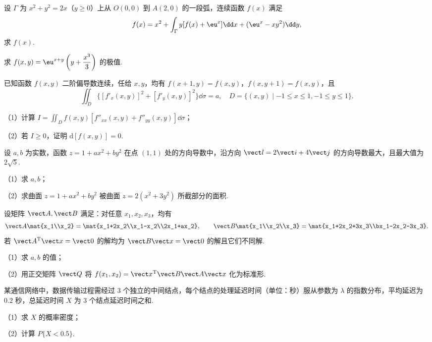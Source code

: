 \begin{question}[index=17,points=10]
设 $\Gamma$ 为 $x^2+y^2=2x$（$y\ge0$）上从 $O(0,0)$ 到 $A(2,0)$ 的一段弧，连续函数 $f(x)$ 满足
\[f(x)=x^2+\int_\Gamma y[f(x)+\eu^x]\dd x+(\eu^x-xy^2)\dd y,\]
求 $f(x)$.
\end{question}
\QuestionBreak\WorkSpace

\begin{question}[index=18,points=12]
求 $f(x,y)=\eu^{x+y}\left(y+\dfrac{x^3}3\right)$ 的极值.
\end{question}
\QuestionBreak\WorkSpace\WorkPageBreak

\begin{question}[index=19,points=12]
已知函数 $f(x,y)$ 二阶偏导数连续，任给 $x,y$，均有 $f(x+1,y)=f(x,y)$，$f(x,y+1)=f(x,y)$，且
\[\iint_D\{[f'_x(x,y)]^2+[f'_y(x,y)]^2\}\dd\sigma=a,\quad D=\{(x,y)\mid-1\le x\le1,-1\le y\le1\}.\]
\par（1）计算 $\displaystyle I=\iint_Df(x,y)[f''_{xx}(x,y)+f''_{yy}(x,y)]\dd\sigma$；
\par（2）若 $I\ge0$，证明 $\mathrm d[f(x,y)]=0$.
\end{question}
\QuestionBreak\WorkSpace

\begin{question}[index=20,points=12]
设 $a,b$ 为实数，函数 $z=1+ax^2+by^2$ 在点 $(1,1)$ 处的方向导数中，沿方向 $\vect l=2\vect i+4\vect j$ 的方向导数最大，且最大值为 $2\sqrt5$.
\par（1）求 $a,b$；
\par（2）求曲面 $z=1+ax^2+by^2$ 被曲面 $z=2(x^2+3y^2)$ 所截部分的面积.
\end{question}
\QuestionBreak\WorkSpace\WorkPageBreak

\begin{question}[index=21,points=12]
设矩阵 $\vect A,\vect B$ 满足：对任意 $x_1,x_2,x_3$，均有
\[\vect A\mat{x_1\\x_2}=\mat{x_1+2x_2\\x_1-x_2\\2x_1+ax_2},\qquad\vect B\mat{x_1\\x_2\\x_3}=\mat{x_1+2x_2+3x_3\\bx_1-2x_2-3x_3}.\]
若 $\vect A^{\mathrm T}\vect x=\vect0$ 的解均为 $\vect B\vect x=\vect0$ 的解且它们不同解.
\par（1）求 $a,b$ 的值；
\par（2）用正交矩阵 $\vect Q$ 将 $f(x_1,x_2)=\vect x^{\mathrm T}\vect B\vect A\vect x$ 化为标准形.
\end{question}
\QuestionBreak\WorkSpace

\begin{question}[index=22,points=12]
某通信网络中，数据传输过程需经过 $3$ 个独立的中间结点，每个结点的处理延迟时间（单位：秒）服从参数为 $\lambda$ 的指数分布，平均延迟为 $0.2$ 秒，总延迟时间 $X$ 为 $3$ 个结点延迟时间之和.
\par（1）求 $X$ 的概率密度；
\par（2）计算 $P\{X<0.5\}$.
\end{question}
\WorkSpace
